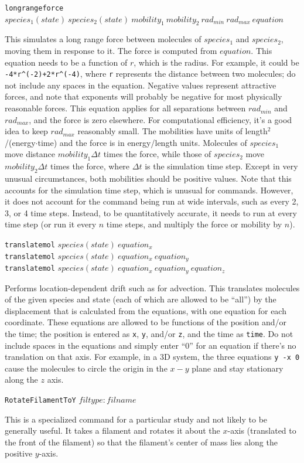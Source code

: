 \documentclass {scrbook}
\newcommand {\ttt} {\texttt}
\begin{document}
\begin{description}
\item{\ttt{longrangeforce} $species_1(state)\ species_2(state)\ mobility_1\ mobility_2\ rad_{min}\ rad_{max}\ equation$}

This simulates a long range force between molecules of $species_1$ and $species_2$, moving them in response to it. The force is computed from $equation$. This equation needs to be a function of $r$, which is the radius. For example, it could be \ttt{-4*r\^{}(-2)+2*r\^{}(-4)}, where \ttt{r} represents the distance between two molecules; do not include any spaces in the equation. Negative values represent attractive forces, and note that exponents will probably be negative for most physically reasonable forces. This equation applies for all separations between $rad_{min}$ and $rad_{max}$, and the force is zero elsewhere. For computational efficiency, it's a good idea to keep $rad_{max}$ reasonably small. The mobilities have units of length$^2$/(energy$\cdot$time) and the force is in energy/length units. Molecules of $species_1$ move distance $mobility_1 \Delta t$ times the force, while those of $species_2$ move $mobility_2 \Delta t$ times the force, where $\Delta t$ is the simulation time step. Except in very unusual circumstances, both mobilities should be positive values. Note that this accounts for the simulation time step, which is unusual for commands. However, it does not account for the command being run at wide intervals, such as every 2, 3, or 4 time steps. Instead, to be quantitatively accurate, it needs to run at every time step (or run it every $n$ time steps, and multiply the force or mobility by $n$).

\item{\ttt{translatemol}} $species(state)\ equation_x$\\
\ttt{translatemol} $species(state)\ equation_x\ equation_y$\\
\ttt{translatemol} $species(state)\ equation_x\ equation_y\ equation_z$

Performs location-dependent drift such as for advection. This translates molecules of the given species and state (each of which are allowed to be ``all'') by the displacement that is calculated from the equations, with one equation for each coordinate. These equations are allowed to be functions of the position and/or the time; the position is entered as \ttt{x}, \ttt{y}, and/or \ttt{z}, and the time as \ttt{time}. Do not include spaces in the equations and simply enter ``0'' for an equation if there's no translation on that axis. For example, in a 3D system, the three equations \ttt{y -x 0} cause the molecules to circle the origin in the $x-y$ plane and stay stationary along the $z$ axis.

\item{\ttt{RotateFilamentToY}} $filtype:filname$

This is a specialized command for a particular study and not likely to be generally useful. It takes a filament and rotates it about the $x$-axis (translated to the front of the filament) so that the filament's center of mass lies along the positive $y$-axis.

\end{description}
\end{document}

